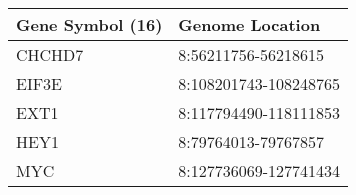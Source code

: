 \begin{tabular}{ll}
\toprule
Gene Symbol (16) &       Genome Location \\
\midrule
          CHCHD7 &   8:56211756-56218615 \\
           EIF3E & 8:108201743-108248765 \\
            EXT1 & 8:117794490-118111853 \\
            HEY1 &   8:79764013-79767857 \\
             MYC & 8:127736069-127741434 \\
\bottomrule
\end{tabular}
